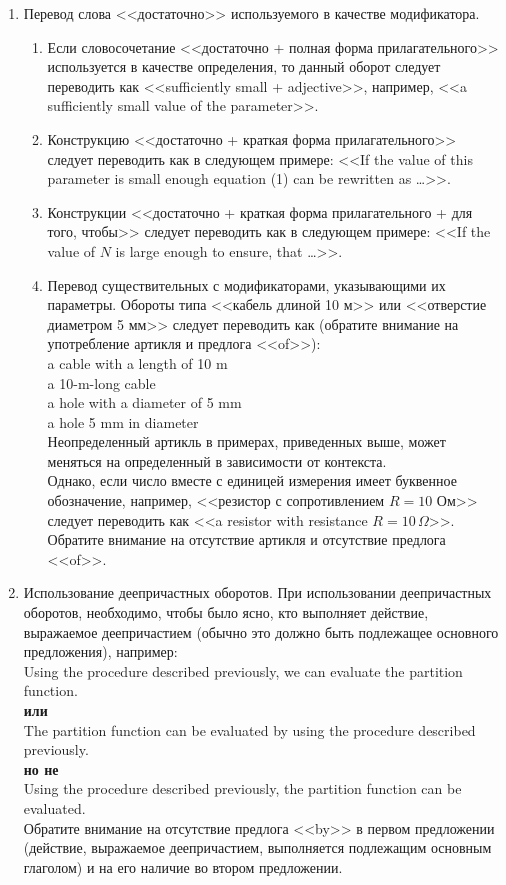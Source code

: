 \documentclass[a5paper, 10pt, twoside, numbers=enddot]{scrartcl}
\begin{document}
\begin{enumerate}
  \item Перевод слова <<достаточно>> используемого в качестве модификатора.
  \begin{enumerate}
    \item Если словосочетание <<достаточно + полная форма прилагательного>> используется в качестве определения, то данный оборот следует переводить как <<sufficiently small + adjective>>, например, <<a sufficiently small value of the parameter>>.

    \item Конструкцию <<достаточно + краткая форма прилагательного>> следует переводить как в следующем примере: <<If the value of this parameter is small enough equation (1) can be rewritten as \ldots>>.

    \item Конструкции <<достаточно + краткая форма прилагательного + для того, чтобы>> следует переводить как в следующем примере: <<If the value of $N$ is large enough to ensure, that \ldots>>.

    \item Перевод существительных с модификаторами, указывающими их параметры. Обороты типа <<кабель длиной 10 м>> или <<отверстие диаметром 5 мм>> следует переводить как (обратите внимание на употребление артикля и предлога <<of>>):\\ [4pt] \textsf{
    a cable with a length of 10 m\\
    a 10-m-long cable\\
    a hole with a diameter of 5 mm\\
    a hole 5 mm in diameter\\ [4pt]}
    Неопределенный артикль в примерах, приведенных выше, может меняться на определенный в зависимости от контекста.\\ [4pt]
    Однако, если число вместе с единицей измерения имеет буквенное обозначение, например, <<резистор с сопротивлением $R = 10$ Ом>> следует переводить как <<a resistor with resistance $R = 10\,\Omega$>>. Обратите внимание на отсутствие артикля и отсутствие предлога <<of>>.
  \end{enumerate}

  \item Использование деепричастных оборотов. При использовании  деепричастных оборотов, необходимо, чтобы было ясно, кто выполняет действие, выражаемое деепричастием (обычно это должно быть подлежащее основного предложения), например:\\ [4pt] \textsf{
  Using the procedure described previously, we can evaluate the partition function.\\ [4pt]
  \textbf{или}\\ [4pt]
  The partition function can be evaluated by using the procedure described previously.\\ [4pt]
  \textbf{но не}\\ [4pt]
  Using the procedure described previously, the partition function can be evaluated.\\ [4pt]}
  Обратите внимание на отсутствие предлога <<by>> в первом предложении (действие, выражаемое деепричастием, выполняется подлежащим основным глаголом) и на его наличие во втором предложении.


\end{enumerate}
\end{document}
